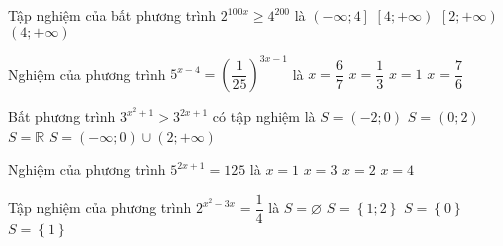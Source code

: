 \begin{ex}%
	Tập nghiệm của bất phương trình $2^{100x}\ge 4^{200}$ là
	\choice
	{ $\left( -\infty ;4 \right]$}
	{\True  $\left[ 4;+\infty  \right)$}
	{ $\left[ 2;+\infty  \right)$}
	{ $\left( 4;+\infty  \right)$}
	\loigiai{
		Ta có	$2^{100x}\ge 4^{200}\Leftrightarrow 2^{100x}\ge 2^{400}\Leftrightarrow 100x\ge 400\Leftrightarrow x\ge 4$. 
		Vậy $S=\left[ 4;+\infty  \right)$.}
\end{ex}

\begin{ex}%
	Nghiệm của phương trình $5^{x-4}=\left( \dfrac{1}{25} \right)^{3x-1}$ là
	\choice
	{\True  $x=\dfrac{6}{7}$}
	{ $x=\dfrac{1}{3}$}
	{ $x=1$}
	{ $x=\dfrac{7}{6}$}
\end{ex}

\begin{ex}%
	Bất phương trình $3^{x^2+1}>3^{2x+1}$ có tập nghiệm là
	\choice
	{ $S=\left( -2;0 \right)$}
	{ $S=\left( 0;2 \right)$}
	{ $S=\mathbb{R}$}
	{\True  $S=\left( -\infty ;0 \right)\cup \left( 2;+\infty  \right)$}
\end{ex}

\begin{ex}%
	Nghiệm của phương trình $5^{2x+1}=125$ là
	\choice
	{\True  $x=1$}
	{ $x=3$}
	{ $x=2$}
	{ $x=4$}
\end{ex}

\begin{ex}%
	Tập nghiệm của phương trình $2^{x^2-3x}=\dfrac{1}{4}$ là
	\choice
	{ $S=\varnothing $}
	{\True  $S=\left\{ 1;2 \right\}$}
	{ $S=\left\{ 0 \right\}$}
	{ $S=\left\{ 1 \right\}$}
\end{ex}

